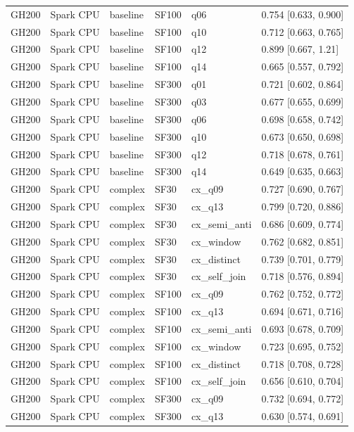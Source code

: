 \begin{longtable}{llllll}
GH200 & Spark CPU & baseline & SF100 & q06 & 0.754 [0.633, 0.900] \\
GH200 & Spark CPU & baseline & SF100 & q10 & 0.712 [0.663, 0.765] \\
GH200 & Spark CPU & baseline & SF100 & q12 & 0.899 [0.667, 1.21] \\
GH200 & Spark CPU & baseline & SF100 & q14 & 0.665 [0.557, 0.792] \\
GH200 & Spark CPU & baseline & SF300 & q01 & 0.721 [0.602, 0.864] \\
GH200 & Spark CPU & baseline & SF300 & q03 & 0.677 [0.655, 0.699] \\
GH200 & Spark CPU & baseline & SF300 & q06 & 0.698 [0.658, 0.742] \\
GH200 & Spark CPU & baseline & SF300 & q10 & 0.673 [0.650, 0.698] \\
GH200 & Spark CPU & baseline & SF300 & q12 & 0.718 [0.678, 0.761] \\
GH200 & Spark CPU & baseline & SF300 & q14 & 0.649 [0.635, 0.663] \\
GH200 & Spark CPU & complex & SF30 & cx\_q09 & 0.727 [0.690, 0.767] \\
GH200 & Spark CPU & complex & SF30 & cx\_q13 & 0.799 [0.720, 0.886] \\
GH200 & Spark CPU & complex & SF30 & cx\_semi\_anti & 0.686 [0.609, 0.774] \\
GH200 & Spark CPU & complex & SF30 & cx\_window & 0.762 [0.682, 0.851] \\
GH200 & Spark CPU & complex & SF30 & cx\_distinct & 0.739 [0.701, 0.779] \\
GH200 & Spark CPU & complex & SF30 & cx\_self\_join & 0.718 [0.576, 0.894] \\
GH200 & Spark CPU & complex & SF100 & cx\_q09 & 0.762 [0.752, 0.772] \\
GH200 & Spark CPU & complex & SF100 & cx\_q13 & 0.694 [0.671, 0.716] \\
GH200 & Spark CPU & complex & SF100 & cx\_semi\_anti & 0.693 [0.678, 0.709] \\
GH200 & Spark CPU & complex & SF100 & cx\_window & 0.723 [0.695, 0.752] \\
GH200 & Spark CPU & complex & SF100 & cx\_distinct & 0.718 [0.708, 0.728] \\
GH200 & Spark CPU & complex & SF100 & cx\_self\_join & 0.656 [0.610, 0.704] \\
GH200 & Spark CPU & complex & SF300 & cx\_q09 & 0.732 [0.694, 0.772] \\
GH200 & Spark CPU & complex & SF300 & cx\_q13 & 0.630 [0.574, 0.691] \\

\end{longtable}
